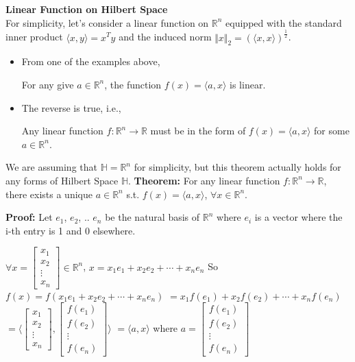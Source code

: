 \documentclass{article}
\begin{document}
\textbf{Linear Function on Hilbert Space} \\
For simplicity, let's consider a linear function on $\mathbb{R}^{n}$ equipped with the standard inner product $\langle x,y \rangle = x^T y $ and the induced norm $\Vert x \Vert_2 = (\langle x,x\rangle )^\frac{1}{2}$. 

\begin{itemize}
    \item From one of the examples above, 
        \begin{center}
            For any give $a \in \mathbb{R}^{n}$, the function $f(x) = \langle a,x\rangle $ is linear.
        \end{center}
    \item The reverse is true, i.e.,
        \begin{center}
            Any linear function $f: \mathbb{R}^{n} \to \mathbb{R}$ must be in the form of $f(x) = \langle a,x\rangle $ for some $a \in \mathbb{R}^{n}$.
        \end{center}
\end{itemize}

\pagebreak
We are assuming that $\mathbb{H} = \mathbb{R}^{n}$ for simplicity, but this theorem actually holds for any forms of Hilbert Space $\mathbb{H}$. 
\bigbreak
\textbf{Theorem:} For any linear function $f: \mathbb{R}^{n} \to \mathbb{R}$, there exists a unique $a \in \mathbb{R}^{n}$ s.t. $f(x) = \langle a,x\rangle $, $\forall x \in \mathbb{R}^{n}$.

\bigbreak

\textbf{Proof:} Let $e_1$, $e_2$, .. $e_n$ be the natural basis of $\mathbb{R}^{n}$ where $e_i$ is a vector where the i-th entry is 1 and 0 elsewhere. \bigbreak

$\forall x = \begin{bmatrix} x_1 \\ x_2 \\ \vdots \\ x_n \end{bmatrix} \in \mathbb{R}^{n}$, $ x = x_1 e_1 + x_2 e_2 + \cdots + x_n e_n$ \bigbreak
So $f(x) = f(x_1 e_1 + x_2 e_2 + \cdots + x_n e_n)$ \bigbreak
$ = x_1 f(e_1) + x_2 f(e_2) + \cdots + x_n f(e_n)$ \bigbreak
 $ = \langle \begin{bmatrix} x_1 \\ x_2 \\ \vdots \\ x_n \end{bmatrix}, \begin{bmatrix} f(e_1) \\ f(e_2) \\ \vdots \\ f(e_n) \end{bmatrix}\rangle $ \bigbreak
 $ = \langle a, x\rangle $ where $a = \begin{bmatrix} f(e_1) \\ f(e_2) \\ \vdots \\ f(e_n) \end{bmatrix}$ 
\end{document}
